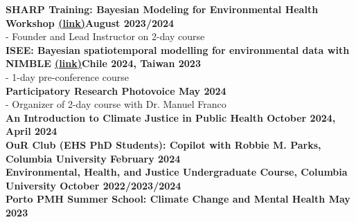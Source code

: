 \noindent \textbf{SHARP Training: Bayesian Modeling for Environmental Health Workshop \href{https://www.publichealth.columbia.edu/academics/non-degree-special-programs/professional-non-degree-programs/skills-health-research-professionals-sharp-training/bayesian-modeling}{(link)}\hfill August 2023/2024}\\
\noindent - Founder and Lead Instructor on 2-day course \\

\noindent \textbf{ISEE: Bayesian spatiotemporal modelling for environmental data with NIMBLE \href{https://iseeconference.org/scientific-program/}{(link)}\hfill Chile 2024, Taiwan 2023}\\
\noindent - 1-day pre-conference course\\

\noindent \textbf{Participatory Research Photovoice \hfill May 2024}\\
\noindent - Organizer of 2-day course with Dr. Manuel Franco\\

\noindent \textbf{An Introduction to Climate Justice in Public Health \hfill October 2024, April 2024}\\

\noindent \textbf{OuR Club (EHS PhD Students): Copilot with Robbie M. Parks, Columbia University \hfill February 2024}\\

\noindent \textbf{Environmental, Health, and Justice Undergraduate Course, Columbia University \hfill October 2022/2023/2024}\\

\noindent \textbf{Porto PMH Summer School: Climate Change and Mental Health \hfill May 2023}\\


